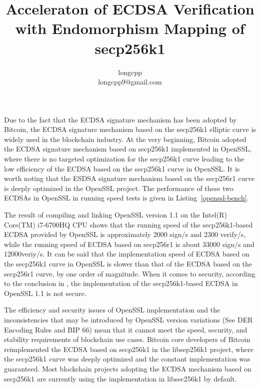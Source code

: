 \documentclass{article}
\begin{document}
\title{ Acceleraton of ECDSA Verification with Endomorphism Mapping of  secp256k1}
\author{longcpp \\ longcpp9@gmail.com}

\maketitle

Due to the fact that the ECDSA signature mechanism has been adopted by Bitcoin, 
the ECDSA signature mechanism based on the secp256k1 elliptic curve is widely used in the blockchain industry. 
At the very beginning, Bitcoin adopted the ECDSA signature mechanism based on secp256k1 implemented in OpenSSL,
where there is no targeted optimization for the secp256k1 curve 
leading to the low efficiency of the ECDSA based on the secp256k1 curve in OpenSSL. 
It is worth noting that the ESDSA signature mechanism based on the secp256r1 curve is deeply optimized in the OpenSSL project. The performance of these two ECDSAs in OpenSSL in running speed tests is given in Listing~\ref{openssl-bench}.



The result of compiling and linking OpenSSL version 1.1 on the Intel(R) Core(TM) i7-6700HQ CPU shows that 
the running speed of the secp256k1-based ECDSA provided by OpenSSL is approximately 2000 sign/s and 2300 verify/s, 
while the running speed of ECDSA based on secp256r1 is about 33000 sign/s and 12000veriy/s. 
It can be said that the implementation speed of ECDSA based on the secp256k1 curve in OpenSSL 
is slower than that of the ECDSA based on the secp256r1 curve, by one order of magnitude. 
When it comes to security, according to the conclusion in \cite{ecdsa-side-channel}, 
the implementation of the secp256k1-based ECDSA in OpenSSL 1.1 is not secure.

The efficiency and security issues of OpenSSL implementation and the inconsistencies that 
may be introduced by OpenSSL version variations (See DER Encoding Rules and BIP 66) mean that 
it cannot meet the speed, security, and stability requirements of blockchain use cases. 
Bitcoin core developers of Bitcoin reimplemented the ECDSA based on secp256k1 in the libsep256k1 project, 
where the secp256k1 curve was deeply optimized and the constant implementation was guaranteed. 
Most blockchain projects adopting the ECDSA mechanism based on secp256k1 are currently using the implementation in libsec256k1 by default.
\end{document}
